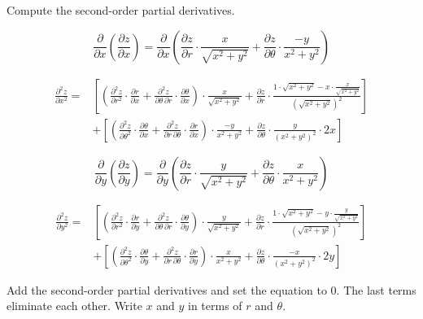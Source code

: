 \documentclass{article}
\begin{document}
\hfill

\noindent Compute the second-order partial derivatives.

\[\frac{\partial}{\partial x}\left(\frac{\partial z}{\partial x}\right)=\frac{\partial}{\partial x}\left(\frac{\partial z}{\partial r}\cdot\frac{x}{\sqrt{x^2+y^2}}+\frac{\partial z}{\partial\theta}\cdot\frac{-y}{x^2+y^2}\right)\]

\begin{align*}\frac{\partial^2z}{\partial x^2}=&\left[\left(\frac{\partial^2z}{\partial r^2}\cdot\frac{\partial r}{\partial x}+\frac{\partial^2 z}{\partial\theta\,\partial r}\cdot\frac{\partial\theta}{\partial x}\right)\cdot\frac{x}{\sqrt{x^2+y^2}}+\frac{\partial z}{\partial r}\cdot\frac{1\cdot\sqrt{x^2+y^2}-x\cdot\frac{x}{\sqrt{x^2+y^2}}}{\left(\sqrt{x^2+y^2}\right)^2}\right]\\&+\left[\left(\frac{\partial^2z}{\partial \theta^2}\cdot\frac{\partial \theta}{\partial x}+\frac{\partial^2 z}{\partial r\,\partial \theta}\cdot\frac{\partial r}{\partial x}\right)\cdot\frac{-y}{x^2+y^2}+\frac{\partial z}{\partial\theta}\cdot\frac{y}{(x^2+y^2)^2}\cdot2x\right]\end{align*}

\hfill

\[\frac{\partial}{\partial y}\left(\frac{\partial z}{\partial y}\right)=\frac{\partial}{\partial y}\left(\frac{\partial z}{\partial r}\cdot\frac{y}{\sqrt{x^2+y^2}}+\frac{\partial z}{\partial \theta}\cdot\frac{x}{x^2+y^2}\right)\]

\begin{align*}\frac{\partial^2z}{\partial y^2}=&\left[\left(\frac{\partial^2z}{\partial r^2}\cdot\frac{\partial r}{\partial y}+\frac{\partial^2 z}{\partial\theta\,\partial r}\cdot\frac{\partial\theta}{\partial y}\right)\cdot\frac{y}{\sqrt{x^2+y^2}}+\frac{\partial z}{\partial r}\cdot\frac{1\cdot\sqrt{x^2+y^2}-y\cdot\frac{y}{\sqrt{x^2+y^2}}}{\left(\sqrt{x^2+y^2}\right)^2}\right]\\&+\left[\left(\frac{\partial^2z}{\partial \theta^2}\cdot\frac{\partial \theta}{\partial y}+\frac{\partial^2 z}{\partial r\,\partial \theta}\cdot\frac{\partial r}{\partial y}\right)\cdot\frac{x}{x^2+y^2}+\frac{\partial z}{\partial\theta}\cdot\frac{-x}{(x^2+y^2)^2}\cdot2y\right]\end{align*}

\hfill

\noindent Add the second-order partial derivatives and set the equation to $0$. The last terms eliminate each other. Write $x$ and $y$ in terms of $r$ and $\theta$.
\end{document}
